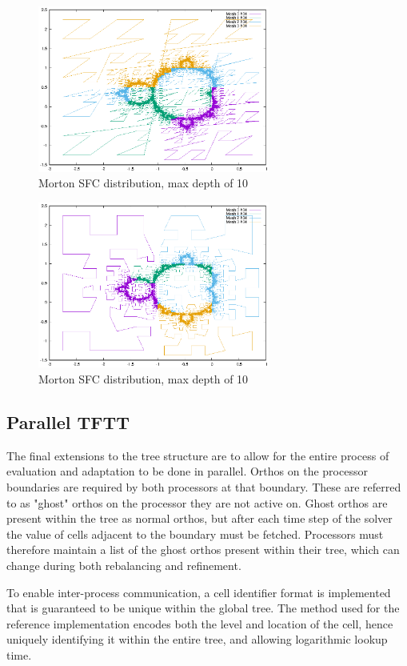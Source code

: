 \documentclass[12pt]{article}
\begin{document}
\begin{figure}[H]
\caption{Morton SFC distribution, max depth of 10}
\label{sfc-mort}
\includegraphics[width=3in]{mort.eps}
\end{figure}

\begin{figure}[H]
\caption{Morton SFC distribution, max depth of 10}
\label{sfc-hilb}
\includegraphics[width=3in]{hilb.eps}
\end{figure}

\subsection{Parallel TFTT}

The final extensions to the tree structure are to allow for the entire process of evaluation and adaptation to be done in parallel. Orthos on the processor boundaries are required by both processors at that boundary. These are referred to as "ghost" orthos on the processor they are not active on. Ghost orthos are present within the tree as normal orthos, but after each time step of the solver the value of cells adjacent to the boundary must be fetched. Processors must therefore maintain a list of the ghost orthos present within their tree, which can change during both rebalancing and refinement. 

To enable inter-process communication, a cell identifier format is implemented that is guaranteed to be unique within the global tree. The method used for the reference implementation encodes both the level and location of the cell, hence uniquely identifying it within the entire tree, and allowing logarithmic lookup time. 
\end{document}

